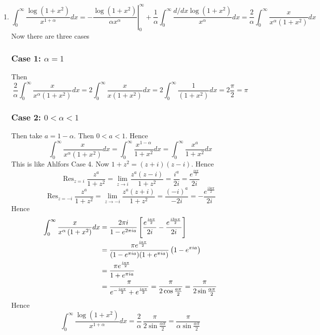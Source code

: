 \documentclass[a4paper, 11pt]{article}
\newcommand{\Res}{\operatorname{Res}}
\begin{document}
{\begin{enumerate}[label=(\alph*)]
\item $$	\int_0^{\infty} \frac{\log \left(1+x^2\right)}{x^{1+\alpha}} d x =-\left.\frac{\log \left(1+x^2\right)}{\alpha x^\alpha}\right|_0 ^{\infty}+\frac{1}{\alpha} \int_0^{\infty} \frac{d / d x \log \left(1+x^2\right)}{x^\alpha} d x  =\frac{2}{\alpha} \int_0^{\infty} \frac{x}{x^\alpha\left(1+x^2\right)} d x$$Now there are three cases
\subsubsection*{Case 1: $\alpha=1$}

Then $$\frac{2}{\alpha} \int_0^{\infty} \frac{x}{x^\alpha\left(1+x^2\right)} d x= 2\int_0^{\infty} \frac{x}{x\left(1+x^2\right)} d x=2\int_0^{\infty} \frac{1}{\left(1+x^2\right)} d x=2\frac{\pi}{2}=\pi$$

\subsubsection*{Case 2: $0<\alpha<1$}
Then take $a=1-\alpha$. Then $0<a<1$. Hence $$\int_0^{\infty} \frac{x}{x^\alpha\left(1+x^2\right)} d x= \int_0^{\infty} \frac{x^{1-\alpha}}{1+x^2} d x= \int_0^{\infty} \frac{x^a}{1+x^2} d x$$This is like Ahlfors Case 4.  Now $1+z^2=(z+i)(z-i)$. Hence $$\Res_{z=i}\frac{z^a}{1+z^2}=\lim\limits_{z\to i}\frac{z^a(z-i)}{1+z^2}=\frac{i^a}{2i}=\frac{e^{\frac{ia\pi}{2}}}{2i}$$
$$\Res_{z=-i}\frac{z^a}{1+z^2}=\lim\limits_{z\to -i}\frac{z^a(z+i)}{1+z^2}=\frac{(-i)^a}{-2i}=-\frac{e^{\frac{i3a\pi}{2}}}{2i}$$ Hence \begin{align*}
	\int_0^{\infty} \frac{x}{x^\alpha\left(1+x^2\right)} d x & =\frac{2\pi i}{1-e^{2\pi i a}}\left[ \frac{e^{\frac{ia\pi}{2}}}{2i}-\frac{e^{\frac{i3a\pi}{2}}}{2i} \right]                         \\
	                                                         & = \frac{\pi e^{\frac{ia\pi}{2}}}{(1-e^{\pi i a})(1+e^{\pi i a})}\left(1-e^{\pi i a}  \right)                                        \\
	                                                         & = \frac{\pi e^{\frac{ia\pi}{2}}}{1+e^{\pi i a}}                                                                                \\
	                                                         & = \frac{\pi}{e^{-\frac{ia\pi}{2}}+e^{\frac{ia\pi}{2}}}=\frac{\pi}{2\cos \frac{a\pi}{2}}=\frac{\pi}{2\sin \frac{\alpha \pi}{2}}
\end{align*}
Hence $$	\int_0^{\infty} \frac{\log \left(1+x^2\right)}{x^{1+\alpha}} d x=\frac{2}{\alpha} \, \frac{\pi}{2\sin \frac{\alpha \pi}{2}}=\frac{\pi}{\alpha\sin \frac{\alpha \pi}{2}}$$

\end{enumerate}}
\end{document}
